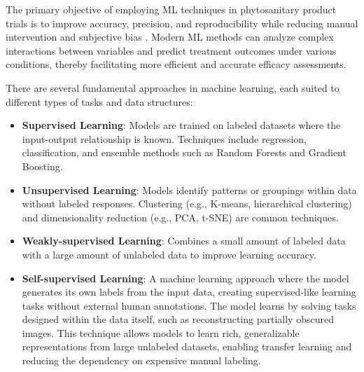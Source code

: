 \documentclass[12pt,a4paper,oneside]{report}
\begin{document}
The primary objective of employing ML techniques in phytosanitary product trials 
is to improve accuracy, precision, and reproducibility while reducing manual 
intervention and subjective bias \cite{bockVisualEstimatesFully2020}. Modern ML methods can analyze complex interactions 
between variables and predict treatment outcomes under various conditions, thereby 
facilitating more efficient and accurate efficacy assessments.

There are several fundamental approaches in machine learning, each suited to different 
types of tasks and data structures:

\begin{itemize}
    \item \textbf{Supervised Learning}: Models are trained on labeled datasets where 
    the input-output relationship is known. Techniques include regression, classification, 
    and ensemble methods such as Random Forests and Gradient Boosting.
    \item \textbf{Unsupervised Learning}: Models identify patterns or groupings within 
    data without labeled responses. Clustering (e.g., K-means, hierarchical clustering) 
    and dimensionality reduction (e.g., PCA, t-SNE) are common techniques.
    \item \textbf{Weakly-supervised Learning}: Combines a small amount of labeled data with 
    a large amount of unlabeled data to improve learning accuracy.
    \item \textbf{Self-supervised Learning}: A machine learning approach where the model
    generates its own labels from the input data, creating supervised-like learning
    tasks without external human annotations. The model learns by solving tasks
    designed within the data itself, such as
    reconstructing partially obscured images. This technique allows models to learn rich, generalizable
    representations from large unlabeled datasets, enabling transfer learning and
    reducing the dependency on expensive manual labeling.
\end{itemize}
\end{document}
